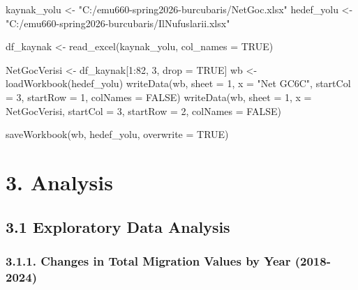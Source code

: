 \documentclass[
  11pt,
  a4paper,
  DIV=11,
  numbers=noendperiod]{scrartcl}
\newenvironment{Shaded}{\begin{snugshade}}{\end{snugshade}}
\newcommand{\AttributeTok}[1]{\textcolor[rgb]{0.40,0.45,0.13}{#1}}
\newcommand{\ConstantTok}[1]{\textcolor[rgb]{0.56,0.35,0.01}{#1}}
\newcommand{\DecValTok}[1]{\textcolor[rgb]{0.68,0.00,0.00}{#1}}
\newcommand{\FunctionTok}[1]{\textcolor[rgb]{0.28,0.35,0.67}{#1}}
\newcommand{\NormalTok}[1]{\textcolor[rgb]{0.00,0.23,0.31}{#1}}
\newcommand{\OtherTok}[1]{\textcolor[rgb]{0.00,0.23,0.31}{#1}}
\newcommand{\SpecialCharTok}[1]{\textcolor[rgb]{0.37,0.37,0.37}{#1}}
\newcommand{\StringTok}[1]{\textcolor[rgb]{0.13,0.47,0.30}{#1}}
\begin{document}
\begin{Shaded}
\begin{Highlighting}[]
\NormalTok{kaynak\_yolu }\OtherTok{\textless{}{-}} \StringTok{"C:/emu660{-}spring2026{-}burcubaris/NetGoc.xlsx"}
\NormalTok{hedef\_yolu  }\OtherTok{\textless{}{-}} \StringTok{"C:/emu660{-}spring2026{-}burcubaris/IlNufuslarii.xlsx"}

\NormalTok{df\_kaynak }\OtherTok{\textless{}{-}} \FunctionTok{read\_excel}\NormalTok{(kaynak\_yolu, }\AttributeTok{col\_names =} \ConstantTok{TRUE}\NormalTok{)}

\NormalTok{NetGocVerisi }\OtherTok{\textless{}{-}}\NormalTok{ df\_kaynak[}\DecValTok{1}\SpecialCharTok{:}\DecValTok{82}\NormalTok{, }\DecValTok{3}\NormalTok{, drop }\OtherTok{=} \ConstantTok{TRUE}\NormalTok{] }
\NormalTok{wb }\OtherTok{\textless{}{-}} \FunctionTok{loadWorkbook}\NormalTok{(hedef\_yolu)}
\FunctionTok{writeData}\NormalTok{(wb, }\AttributeTok{sheet =} \DecValTok{1}\NormalTok{, }\AttributeTok{x =} \StringTok{"Net GC6C\textquotesingle{}"}\NormalTok{, }\AttributeTok{startCol =} \DecValTok{3}\NormalTok{, }\AttributeTok{startRow =} \DecValTok{1}\NormalTok{, }\AttributeTok{colNames =} \ConstantTok{FALSE}\NormalTok{)}
\FunctionTok{writeData}\NormalTok{(wb, }\AttributeTok{sheet =} \DecValTok{1}\NormalTok{, }\AttributeTok{x =}\NormalTok{ NetGocVerisi, }\AttributeTok{startCol =} \DecValTok{3}\NormalTok{, }\AttributeTok{startRow =} \DecValTok{2}\NormalTok{, }\AttributeTok{colNames =} \ConstantTok{FALSE}\NormalTok{)}

\FunctionTok{saveWorkbook}\NormalTok{(wb, hedef\_yolu, }\AttributeTok{overwrite =} \ConstantTok{TRUE}\NormalTok{)}
\end{Highlighting}
\end{Shaded}

\section{3. Analysis}\label{analysis}

\subsection{3.1 Exploratory Data
Analysis}\label{exploratory-data-analysis}

\subsubsection{3.1.1. Changes in Total Migration Values by Year
(2018-2024)}\label{changes-in-total-migration-values-by-year-2018-2024}
\end{document}
